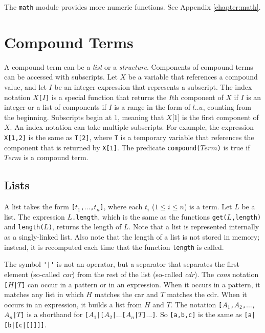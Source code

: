 The \texttt{math} module provides more numeric functions.  See Appendix \ref{chapter:math}.

\section{Compound Terms}
A compound term can be a \emph{list} or a \emph{structure}. Components of compound terms can be accessed with subscripts. Let $X$ be a variable that references a compound value, and let $I$ be an integer expression that represents a subscript. The index notation \texttt{$X$[$I$]} is a special function that returns the $I$th component of $X$ if $I$ is an integer or a list of components if $I$ is a range in the form of $l..u$, counting from the beginning. Subscripts begin at $1$, meaning that $X$[$1$] is the first component of $X$. An index notation can take multiple subscripts. For example, the expression \texttt{X[1,2]} is the same as \texttt{T[2]}, where \texttt{T} is a temporary variable that references the component that is returned by \texttt{X[1]}. The predicate \texttt{compound($Term$)} is true if $Term$ is a compound term.

\subsection{\label{subsec:lists}Lists}
A list takes the form \texttt{[$t_1$,$\ldots$,$t_{n}$]}, where each $t_i$ ($1\le i \le n$) is a term. Let $L$ be a list. The expression \texttt{$L$.length}, which is the same as the functions \texttt{get($L$,length)} and \texttt{length($L$)}, returns the length of $L$. Note that a list is represented internally as a singly-linked list.  Also note that the length of a list is not stored in memory; instead, it is recomputed each time that the function \texttt{length} is called.

The symbol \verb+'|'+ is not an operator, but a separator that separates the first element (so-called \emph{car}) from the rest of the list (so-called \emph{cdr}). The \emph{cons} notation {\tt [$H$\verb+|+$T$]} can occur in a pattern or in an expression. When it occurs in a pattern, it matches any list in which $H$ matches the car and $T$ matches the cdr. When it occurs in an expression, it builds a list from $H$ and $T$. The notation {\tt [$A_1$,$A_2$,$\ldots$,$A_n$\verb+|+$T$]} is a shorthand for {\tt [$A_1$\verb+|+[$A_2$\verb+|+$\ldots$[$A_n$\verb+|+$T$]$\ldots$]}. So \texttt{[a,b,c]} is the same as \texttt{[a|[b|[c|[]]]]}.



